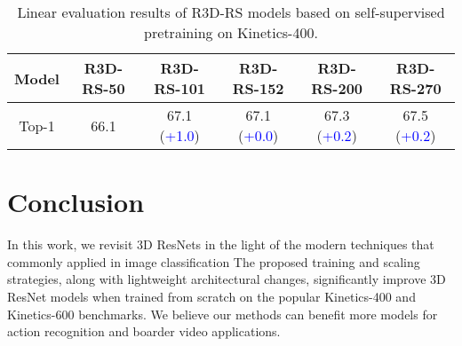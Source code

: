 \documentclass{article} \usepackage{iclr2021_conference,times}
\begin{document}
\setlength{\tabcolsep}{4pt}
\begin{table}[h!]
\centering
\begin{tabular}{c | c| c|c|c|c}
  \toprule
  Model  & 
  R3D-RS-50 & R3D-RS-101 & R3D-RS-152 & R3D-RS-200 & R3D-RS-270\\
  \midrule
 Top-1 & 66.1 & 67.1 (\textcolor{blue}{+1.0}) &67.1 (\textcolor{blue}{+0.0}) & 67.3 (\textcolor{blue}{+0.2}) & 67.5 (\textcolor{blue}{+0.2}) \\
  \bottomrule
\end{tabular}
\vspace{1mm}
\caption{\small{
Linear evaluation results of R3D-RS models based on self-supervised pretraining on Kinetics-400.
}}
\label{tab:k400_ssl} 
\end{table}


\section{Conclusion}
In this work, we revisit 3D ResNets in the light of the modern techniques that commonly applied in image classification
The proposed training and scaling strategies, along with lightweight architectural changes, significantly improve 3D ResNet models when trained from scratch on the popular Kinetics-400 and Kinetics-600 benchmarks.
We believe our methods can benefit more models for action recognition and boarder video applications.

\clearpage
{\small


}
\end{document}
